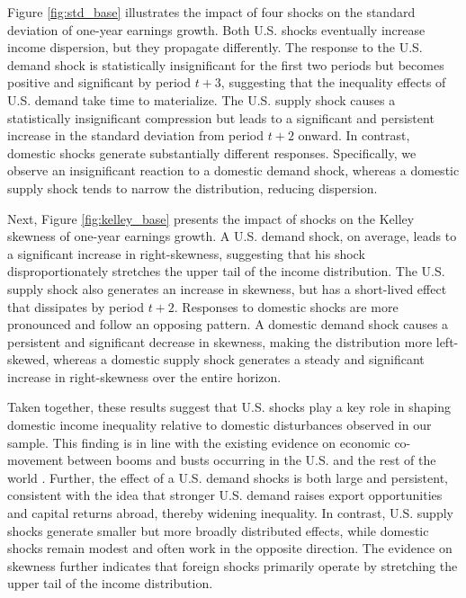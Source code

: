 \documentclass[12pt, a4paper]{article}
\begin{document}
Figure \ref{fig:std_base} illustrates the impact of four shocks on the standard deviation of one-year earnings growth. Both U.S. shocks eventually increase income dispersion, but they propagate differently. The response to the U.S. demand shock is statistically insignificant for the first two periods but becomes positive and significant by period $t+3$, suggesting that the inequality effects of U.S. demand take time to materialize. The U.S. supply shock causes a statistically insignificant compression but leads to a significant and persistent increase in the standard deviation from period $t+2$ onward. In contrast, domestic shocks generate substantially different responses. Specifically, we observe an insignificant reaction to a domestic demand shock, whereas a domestic supply shock tends to narrow the distribution, reducing dispersion.

Next, Figure \ref{fig:kelley_base} presents the impact of shocks on the Kelley skewness of one-year earnings growth. A U.S. demand shock, on average, leads to a significant increase in right-skewness, suggesting that his shock disproportionately stretches the upper tail of the income distribution. The U.S. supply shock also generates an increase in skewness, but has a short-lived effect that dissipates by period $t+2$. Responses to domestic shocks are more pronounced and follow an opposing pattern. A domestic demand shock causes a persistent and significant decrease in skewness, making the distribution more left-skewed, whereas a domestic supply shock generates a steady and significant increase in right-skewness over the entire horizon.

Taken together, these results suggest that U.S. shocks play a key role in shaping domestic income inequality relative to domestic disturbances observed in our sample. This finding is in line with the existing evidence on economic co-movement between booms and busts occurring in the U.S. and the rest of the world \parencite{Kose2003, Kose2012, Fink2015}. Further, the effect of a U.S. demand shocks is both large and persistent, consistent with the idea that stronger U.S. demand raises export opportunities and capital returns abroad, thereby widening inequality. In contrast, U.S. supply shocks generate smaller but more broadly distributed effects, while domestic shocks remain modest and often work in the opposite direction. The evidence on skewness further indicates that foreign shocks primarily operate by stretching the upper tail of the income distribution.
\end{document}
